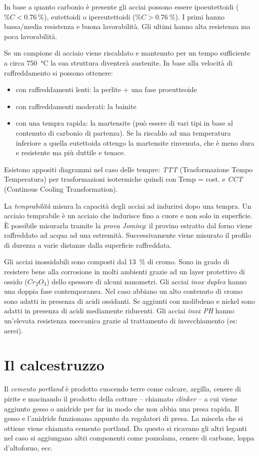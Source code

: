 \documentclass[a5paper,12pt]{article}
\newcommand{\e}{\`E\xspace}  %
\begin{document}
In base a quanto carbonio è presente gli acciai possono essere ipoeutettoidi ($\%C<\SI{0.76}{\%}$), eutettoidi o ipereutettoidi ($\%C>\SI{0.76}{\%}$). I primi hanno bassa/media resistenza e buona lavorabilità. Gli ultimi hanno alta resistenza ma poca lavorabilità.

Se un campione di acciaio viene riscaldato e mantenuto per un tempo sufficiente a circa \SI{750}{\celsius} la sua struttura diventerà austenite. In base alla velocità di raffreddamento si possono ottenere:
\begin{itemize}
	\item con raffreddamenti lenti: la perlite + una fase proeutteoide
	\item con raffreddamenti moderati: la bainite
	\item con una tempra rapida: la martensite (può essere di vari tipi in base al contenuto di carbonio di partenza). Se la riscaldo ad una temperatura inferiore a quella eutettoida ottengo la martensite rinvenuta, che è meno dura e resistente ma più duttile e tenace.
\end{itemize}
Esistono appositi diagrammi nel caso delle tempre: \emph{TTT} (Trasformazione Tempo Temperatura) per trasformazioni isotermiche quindi con Temp = cost.  e \emph{CCT} (Continous Cooling Transformation).

La \emph{temprabilità} misura la capacità degli acciai ad indurirsi dopo una tempra. Un acciaio temprabile è un acciaio che indurisce fino a cuore e non solo in superficie. \e possibile misurarla tramite la \emph{prova Jominy}: il provino estratto dal forno viene raffreddato ad acqua ad una estremità. Successivamente viene misurato il profilo di durezza a varie distanze dalla superficie raffreddata.

Gli acciai inossidabili sono composti dal \SI{13}{\%} di cromo. Sono in grado di resistere bene alla corrosione in molti ambienti grazie ad un layer protettivo di ossido ($Cr_2O_3$) dello spessore di alcuni nanometri.
Gli acciai \emph{inox duplex} hanno una doppia fase contemporanea. Nel caso abbiano un alto contenuto di cromo sono adatti in presenza di acidi ossidanti. Se aggiunti con molibdeno e nickel sono adatti in presenza di acidi mediamente riducenti. Gli acciai \emph{inox PH} hanno un'elevata resistenza meccanica grazie al trattamento di invecchiamento (es: aerei). 
\section{Il calcestruzzo}
Il \emph{cemento portland} è prodotto cuocendo terre come calcare, argilla, cenere di pirite e macinando il prodotto della cotture -- chiamato \emph{clinker} -- a cui viene aggiunto gesso o anidride per far in modo che non abbia una presa rapida. Il gesso e l'anidride funzionano appunto da regolatori di presa. La miscela che si ottiene viene chiamata cemento portland. Da questo si ricavano gli altri leganti nel caso si aggiungano altri componenti come pozzolana, cenere di carbone, loppa d'altoforno, ecc.
 
\end{document}
